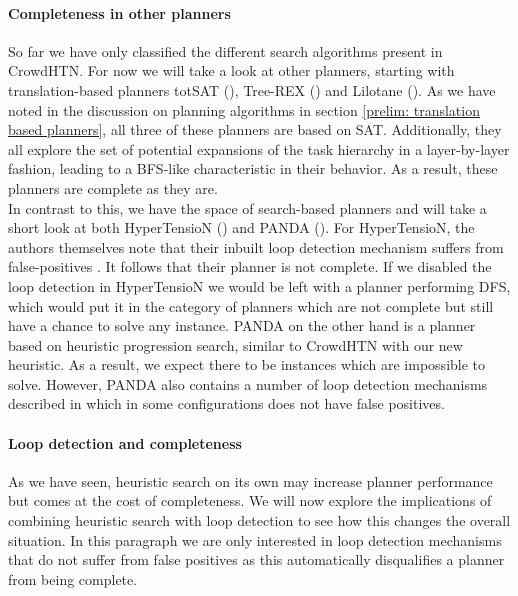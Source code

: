\paragraph{Completeness in other planners}
So far we have only classified the different search algorithms present in CrowdHTN. For now we will take a look at other planners, starting with translation-based planners totSAT (\cite{behnke2018totsat}), Tree-REX (\cite{schreiber2019tree}) and Lilotane (\cite{schreiber2021lilotane}). As we have noted in the discussion on planning algorithms in section \ref{prelim: translation based planners}, all three of these planners are based on SAT. Additionally, they all explore the set of potential expansions of the task hierarchy in a layer-by-layer fashion, leading to a BFS-like characteristic in their behavior. As a result, these planners are complete as they are. \\
In contrast to this, we have the space of search-based planners and will take a short look at both HyperTensioN (\cite{magnaguagno2020hypertension}) and PANDA (\cite{holler2020htn}). For HyperTensioN, the authors themselves note that their inbuilt loop detection mechanism suffers from false-positives \cite{magnaguagno2020hypertension}. It follows that their planner is not complete. If we disabled the loop detection in HyperTensioN we would be left with a planner performing DFS, which would put it in the category of planners which are not complete but still have a chance to solve any instance. PANDA on the other hand is a planner based on heuristic progression search, similar to CrowdHTN with our new heuristic. As a result, we expect there to be instances which are impossible to solve. However, PANDA also contains a number of loop detection mechanisms described in \cite{holler2021loop} which in some configurations does not have false positives.

\paragraph{Loop detection and completeness}
As we have seen, heuristic search on its own may increase planner performance but comes at the cost of completeness. We will now explore the implications of combining heuristic search with loop detection to see how this changes the overall situation. In this paragraph we are only interested in loop detection mechanisms that do not suffer from false positives as this automatically disqualifies a planner from being complete. \\


